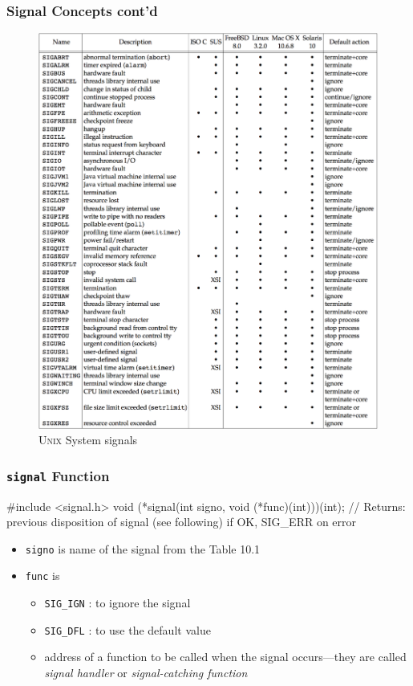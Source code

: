 \documentclass[newPxFont,sthlmFooter,nooffset]{beamer}
\begin{document}
\begin{frame}[t]
  \frametitle{Signal Concepts cont'd}
  \begin{figure}[h]
    \centering
    \includegraphics[width=\linewidth,trim={0 15cm 0 0},clip]{figure/fig10-1_unix_sig.png}
    \caption{\textsc{Unix} System signals}
  \end{figure}
\end{frame}

\begin{frame}[fragile,t]
  \frametitle{\texttt{signal} Function}
\begin{codedef}
#include <signal.h> 
void (*signal(int signo, void (*func)(int)))(int); 
// Returns: previous disposition of signal (see following) if OK, SIG_ERR on error
\end{codedef}

\begin{itemize}[ ]
\item \texttt{signo} is name of the signal from the Table 10.1
\item \texttt{func} is
  \begin{itemize}
  \item \texttt{SIG\_IGN} : to ignore the signal
  \item \texttt{SIG\_DFL} : to use the default value
  \item address of a function to be called when the signal occurs---they are called \textit{signal handler} or \textit{signal-catching function}
  \end{itemize}
\end{itemize}
\end{frame}
\end{document}
